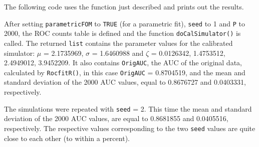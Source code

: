 \documentclass[
]{book}
\newenvironment{Shaded}{\begin{snugshade}}{\end{snugshade}}
\newcommand{\DataTypeTok}[1]{\textcolor[rgb]{0.13,0.29,0.53}{#1}}
\newcommand{\DecValTok}[1]{\textcolor[rgb]{0.00,0.00,0.81}{#1}}
\newcommand{\KeywordTok}[1]{\textcolor[rgb]{0.13,0.29,0.53}{\textbf{#1}}}
\newcommand{\NormalTok}[1]{#1}
\newcommand{\OperatorTok}[1]{\textcolor[rgb]{0.81,0.36,0.00}{\textbf{#1}}}
\newcommand{\OtherTok}[1]{\textcolor[rgb]{0.56,0.35,0.01}{#1}}
\newcommand{\StringTok}[1]{\textcolor[rgb]{0.31,0.60,0.02}{#1}}
\begin{document}
The following code uses the function just described and prints out the results.

\begin{Shaded}
\end{Shaded}

After setting \texttt{parametricFOM} to \texttt{TRUE} (for a parametric fit), \texttt{seed} to 1 and \texttt{P} to 2000, the ROC counts table is defined and the function \texttt{doCalSimulator()} is called. The returned \texttt{list} contains the parameter values for the calibrated simulator: \(\mu\) = 2.1735969, \(\sigma\) = 1.6460988 and \(\zeta\) = 0.0126342, 1.4753512, 2.4949012, 3.9452209. It also contains \texttt{OrigAUC}, the AUC of the original data, calculated by \texttt{RocfitR()}, in this case \texttt{OrigAUC} = 0.8704519, and the mean and standard deviation of the 2000 AUC values, equal to 0.8676727 and 0.0403331, respectively.

The simulations were repeated with \texttt{seed} = 2. This time the mean and standard deviation of the 2000 AUC values, are equal to 0.8681855 and 0.0405516, respectively. The respective values corresponding to the two \texttt{seed} values are quite close to each other (to within a percent).
\end{document}
